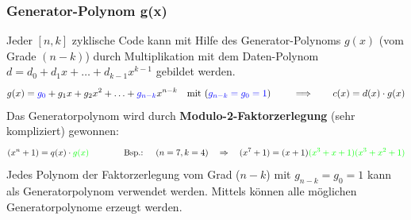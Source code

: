 \subsubsection{Generator-Polynom g(x) }
Jeder $[n,k]$ zyklische Code kann mit Hilfe des Generator-Polynoms $g(x)$ (vom Grade $(n-k)$)
durch Multiplikation mit dem Daten-Polynom $d=d_0 + d_1x + \ldots + d_{k-1}x^{k-1}$ gebildet werden.
$$ g(x) = \textcolor{blue}{g_0} + g_1 x + g_2 x^2 + \ldots + \textcolor{blue}{g_{n-k}} x^{n-k}
\quad \text{mit (} \textcolor{blue}{g_{n-k} = g_0 = 1} \text{) } \qquad \Longrightarrow \qquad
c(x) = d(x) \cdot g(x)$$
Das Generatorpolynom wird durch \textbf{Modulo-2-Faktorzerlegung} (sehr kompliziert) gewonnen: 
$$ (x^n + 1) = q(x) \cdot \textcolor{green}{g(x)} \qquad \qquad \text{Bsp.: } \quad (n=7,k=4) \quad
\Rightarrow \quad (x^7 + 1) = (x+1)\textcolor{green}{(x^3+x+1)(x^3+x^2+1)}$$ Jedes Polynom der
Faktorzerlegung vom Grad ($n-k$) mit $g_{n-k} = g_0 = 1$ kann als Generatorpolynom verwendet
werden. Mittels \textbf{} können alle möglichen Generatorpolynome
erzeugt werden.


